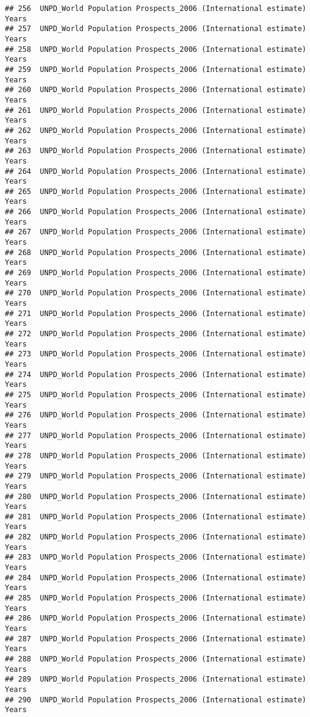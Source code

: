 \documentclass[]{article}
\begin{document}
\begin{verbatim}
## 256  UNPD_World Population Prospects_2006 (International estimate) Years
## 257  UNPD_World Population Prospects_2006 (International estimate) Years
## 258  UNPD_World Population Prospects_2006 (International estimate) Years
## 259  UNPD_World Population Prospects_2006 (International estimate) Years
## 260  UNPD_World Population Prospects_2006 (International estimate) Years
## 261  UNPD_World Population Prospects_2006 (International estimate) Years
## 262  UNPD_World Population Prospects_2006 (International estimate) Years
## 263  UNPD_World Population Prospects_2006 (International estimate) Years
## 264  UNPD_World Population Prospects_2006 (International estimate) Years
## 265  UNPD_World Population Prospects_2006 (International estimate) Years
## 266  UNPD_World Population Prospects_2006 (International estimate) Years
## 267  UNPD_World Population Prospects_2006 (International estimate) Years
## 268  UNPD_World Population Prospects_2006 (International estimate) Years
## 269  UNPD_World Population Prospects_2006 (International estimate) Years
## 270  UNPD_World Population Prospects_2006 (International estimate) Years
## 271  UNPD_World Population Prospects_2006 (International estimate) Years
## 272  UNPD_World Population Prospects_2006 (International estimate) Years
## 273  UNPD_World Population Prospects_2006 (International estimate) Years
## 274  UNPD_World Population Prospects_2006 (International estimate) Years
## 275  UNPD_World Population Prospects_2006 (International estimate) Years
## 276  UNPD_World Population Prospects_2006 (International estimate) Years
## 277  UNPD_World Population Prospects_2006 (International estimate) Years
## 278  UNPD_World Population Prospects_2006 (International estimate) Years
## 279  UNPD_World Population Prospects_2006 (International estimate) Years
## 280  UNPD_World Population Prospects_2006 (International estimate) Years
## 281  UNPD_World Population Prospects_2006 (International estimate) Years
## 282  UNPD_World Population Prospects_2006 (International estimate) Years
## 283  UNPD_World Population Prospects_2006 (International estimate) Years
## 284  UNPD_World Population Prospects_2006 (International estimate) Years
## 285  UNPD_World Population Prospects_2006 (International estimate) Years
## 286  UNPD_World Population Prospects_2006 (International estimate) Years
## 287  UNPD_World Population Prospects_2006 (International estimate) Years
## 288  UNPD_World Population Prospects_2006 (International estimate) Years
## 289  UNPD_World Population Prospects_2006 (International estimate) Years
## 290  UNPD_World Population Prospects_2006 (International estimate) Years

\end{verbatim}
\end{document}
